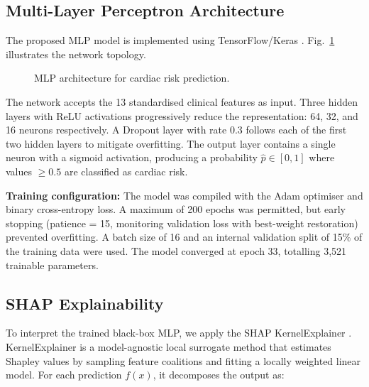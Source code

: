 \documentclass[conference]{IEEEtran}
\begin{document}
\subsection{Multi-Layer Perceptron Architecture}

The proposed MLP model is implemented using TensorFlow/Keras \cite{tensorflow2015}. Fig.~\ref{fig:architecture} illustrates the network topology.

\begin{figure}[H]
\centering
\caption{MLP architecture for cardiac risk prediction.}
\label{fig:architecture}
\end{figure}

The network accepts the 13 standardised clinical features as input. Three hidden layers with ReLU activations progressively reduce the representation: 64, 32, and 16 neurons respectively. A Dropout layer with rate 0.3 follows each of the first two hidden layers to mitigate overfitting. The output layer contains a single neuron with a sigmoid activation, producing a probability $\hat{p} \in [0, 1]$ where values $\geq 0.5$ are classified as cardiac risk.

\textbf{Training configuration:} The model was compiled with the Adam optimiser \cite{kingma2014adam} and binary cross-entropy loss. A maximum of 200 epochs was permitted, but early stopping (patience = 15, monitoring validation loss with best-weight restoration) prevented overfitting. A batch size of 16 and an internal validation split of 15\% of the training data were used. The model converged at epoch 33, totalling 3,521 trainable parameters.

\subsection{SHAP Explainability}

To interpret the trained black-box MLP, we apply the SHAP KernelExplainer \cite{lundberg2017unified}. KernelExplainer is a model-agnostic local surrogate method that estimates Shapley values by sampling feature coalitions and fitting a locally weighted linear model. For each prediction $f(x)$, it decomposes the output as:
\end{document}
